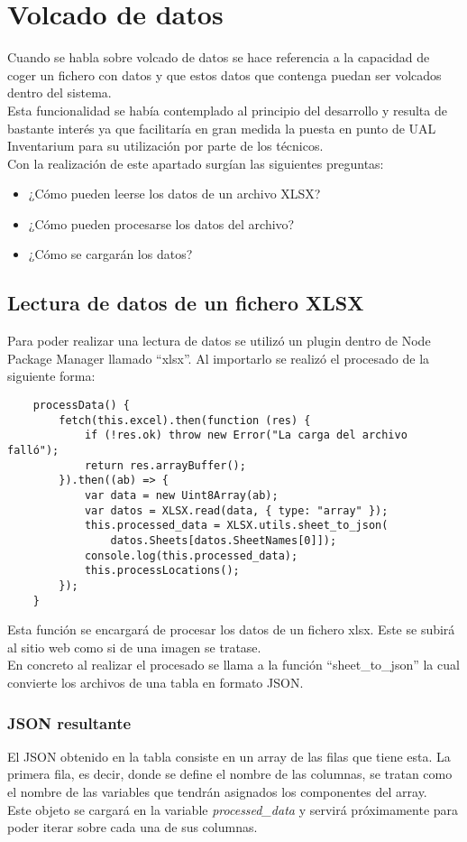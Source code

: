 \section{Volcado de datos}
Cuando se habla sobre volcado de datos se hace referencia a la capacidad de coger un fichero con datos y que estos datos que contenga puedan ser volcados dentro del sistema.
\\Esta funcionalidad se había contemplado al principio del desarrollo y resulta de bastante interés ya que facilitaría en gran medida la puesta en punto de UAL Inventarium para su utilización por parte de los técnicos.
\\Con la realización de este apartado surgían las siguientes preguntas:
\begin{itemize}
    \item ¿Cómo pueden leerse los datos de un archivo XLSX?
    \item ¿Cómo pueden procesarse los datos del archivo?
    \item ¿Cómo se cargarán los datos?
\end{itemize}

\subsection{Lectura de datos de un fichero XLSX}
Para poder realizar una lectura de datos se utilizó un plugin dentro de Node Package Manager llamado ``xlsx''. Al importarlo se realizó el procesado de la siguiente forma:
\begin{verbatim}
    processData() {
        fetch(this.excel).then(function (res) {
            if (!res.ok) throw new Error("La carga del archivo falló");
            return res.arrayBuffer();
        }).then((ab) => {
            var data = new Uint8Array(ab);
            var datos = XLSX.read(data, { type: "array" });
            this.processed_data = XLSX.utils.sheet_to_json(
                datos.Sheets[datos.SheetNames[0]]);
            console.log(this.processed_data);
            this.processLocations();
        });
    }
\end{verbatim}
Esta función se encargará de procesar los datos de un fichero xlsx. Este se subirá al sitio web como si de una imagen se tratase.
\\En concreto al realizar el procesado se llama a la función ``sheet\_to\_json'' la cual convierte los archivos de una tabla en formato JSON.

\subsubsection{JSON resultante}
El JSON obtenido en la tabla consiste en un array de las filas que tiene esta. La primera fila, es decir, donde se define el nombre de las columnas, se tratan como el nombre de las variables que tendrán asignados los componentes del array.
\\Este objeto se cargará en la variable \textit{processed\_data} y servirá próximamente para poder iterar sobre cada una de sus columnas.

